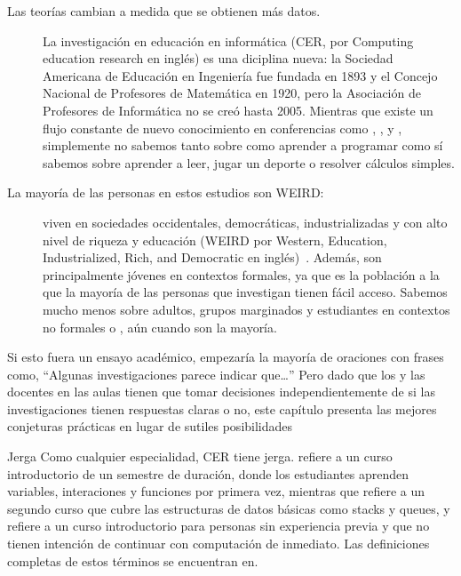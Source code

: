 \begin{description}

\item[Las teorías cambian a medida que se obtienen más datos.]
  La investigación en educación en informática (CER, por Computing education research en inglés) es una diciplina nueva:
  la Sociedad Americana de Educación en Ingeniería fue fundada en 1893 y el Concejo Nacional de Profesores de Matemática en 1920, pero la Asociación de Profesores de Informática no se creó hasta 2005.
  Mientras que existe un flujo constante de nuevo conocimiento en conferencias como ,
  ,
  y ,
  simplemente no sabemos tanto sobre como aprender a programar como sí sabemos sobre aprender a leer, jugar un deporte o resolver cálculos simples.
  
\item[La mayoría de las personas en estos estudios son WEIRD:]
  viven en sociedades occidentales, democráticas, industrializadas y con alto nivel de riqueza y educación (WEIRD por Western, Education, Industrialized, Rich, and Democratic en inglés)~\cite{Henr2010}.
  Además,
  son principalmente jóvenes en contextos formales, ya que es la población a la que la mayoría de las personas que investigan tienen fácil acceso. 
  Sabemos mucho menos sobre adultos, grupos marginados y estudiantes en contextos no formales o ,
  aún cuando son la mayoría.

\end{description}

Si esto fuera un ensayo académico, empezaría la mayoría de oraciones con frases como,
``Algunas investigaciones parece indicar que{\ldots}''
Pero dado que los y las docentes en las aulas tienen que tomar decisiones independientemente de si las investigaciones tienen respuestas claras o no, este capítulo presenta las mejores conjeturas prácticas en lugar de sutiles posibilidades 

\begin{aside}{Jerga}
  Como cualquier especialidad,
  CER tiene jerga.
   refiere a un curso introductorio de un semestre de duración, donde los estudiantes aprenden variables, interaciones y funciones por primera vez, mientras que  refiere a un segundo curso que cubre las estructuras de datos básicas como stacks y queues,
  y  refiere a un curso introductorio para personas sin experiencia previa y que no tienen intención de continuar con computación de inmediato.
  Las definiciones completas de estos términos se encuentran en.
\end{aside}


